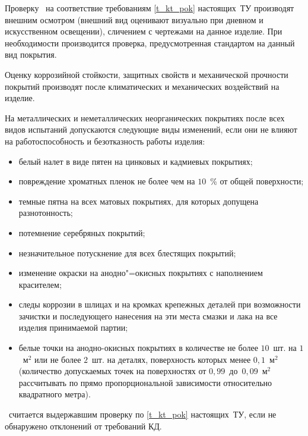 Проверку \dut \ на соответствие требованиям \ref{t_kt_pok} настоящих~ТУ производят внешним осмотром (внешний вид оценивают визуально при дневном и искусственном освещении), сличением с чертежами на данное изделие. При необходимости производится проверка, предусмотренная стандартом на данный вид покрытия.

Оценку коррозийной стойкости, защитных свойств и механической прочности покрытий производят после климатических и механических воздействий на изделие.

На металлических и неметаллических неорганических покрытиях после всех видов испытаний допускаются следующие виды изменений, если они не влияют на работоспособность и безотказность работы изделия:
%
\begin{itemize}
	\item белый налет в виде пятен на цинковых и кадмиевых покрытиях;
	\item повреждение хроматных пленок не более чем на $10$~\% от общей поверхности;
	\item темные пятна на всех матовых покрытиях, для которых допущена разнотонность;
	\item потемнение серебряных покрытий;
	\item незначительное потускнение для всех блестящих покрытий;
	\item изменение окраски на анодно"=окисных покрытиях с наполнением красителем;
	\item следы коррозии в шлицах и на кромках крепежных деталей при возможности зачистки и последующего нанесения на эти места смазки и лака на все изделия принимаемой партии;
	\item белые точки на анодно-окисных покрытиях в количестве не более $10$~шт. на $1$~$\text{м}^2$ или не более $2$~шт. на деталях, поверхность которых менее $0,1$~$\text{м}^2$ (количество допускаемых точек на поверхностях от $0,99$~до~$0,09$~$\text{м}^2$ рассчитывать по прямо пропорциональной зависимости относительно квадратного метра).
\end{itemize}

\dut \ считается выдержавшим проверку по \ref{t_kt_pok} настоящих~ТУ, если не обнаружено отклонений от требований КД.
